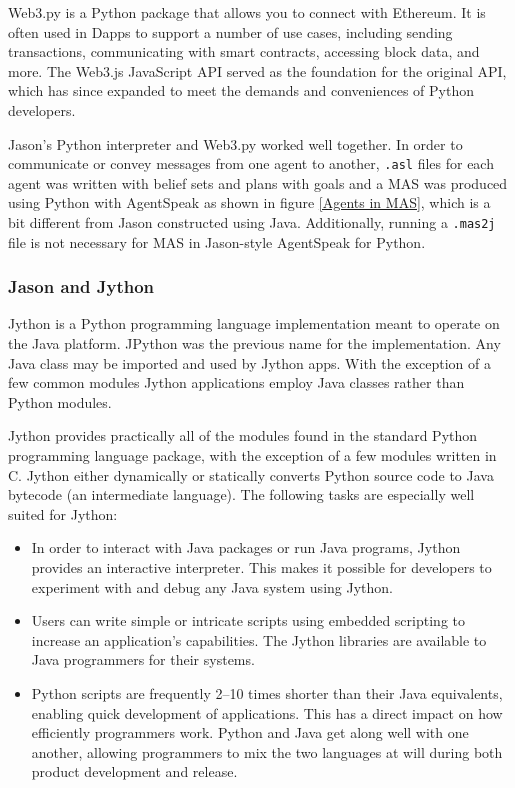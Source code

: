 Web3.py is a Python package that allows you to connect with Ethereum. It is often used in \ac{Dapp}s to support a number of use cases, including sending transactions, communicating with smart contracts, accessing block data, and more. The Web3.js JavaScript \ac{API} served as the foundation for the original \ac{API}, which has since expanded to meet the demands and conveniences of Python developers.

\vspace{.5cm}

Jason's Python interpreter and Web3.py worked well together. In order to communicate or convey messages from one agent to another, \texttt{.asl} files for each agent was written with belief sets and plans with goals and a \ac{MAS} was produced using Python with AgentSpeak as shown in figure \ref{Agents in MAS}, which is a bit different from Jason constructed using Java. Additionally, running a \texttt{.mas2j} file is not necessary for \ac{MAS} in Jason-style AgentSpeak for Python.

\subsubsection{Jason and Jython}

Jython is a Python programming language implementation meant to operate on the Java platform. JPython was the previous name for the implementation. Any Java class may be imported and used by Jython apps. With the exception of a few common modules Jython applications employ Java classes rather than Python modules. 

\vspace{.5cm}
Jython provides practically all of the modules found in the standard Python programming language package, with the exception of a few modules written in C. Jython either dynamically or statically converts Python source code to Java bytecode (an intermediate language). The following tasks are especially well suited for Jython:

\begin{itemize}
    \item In order to interact with Java packages or run Java programs, Jython provides an interactive interpreter. This makes it possible for developers to experiment with and debug any Java system using Jython.
    \vspace{.5cm}
    \item Users can write simple or intricate scripts using embedded scripting to increase an application's capabilities. The Jython libraries are available to Java programmers for their systems.
    \vspace{.5cm}
     \item Python scripts are frequently 2–10 times shorter than their Java equivalents, enabling quick development of applications. This has a direct impact on how efficiently programmers work. Python and Java get along well with one another, allowing programmers to mix the two languages at will during both product development and release.
\end{itemize}


